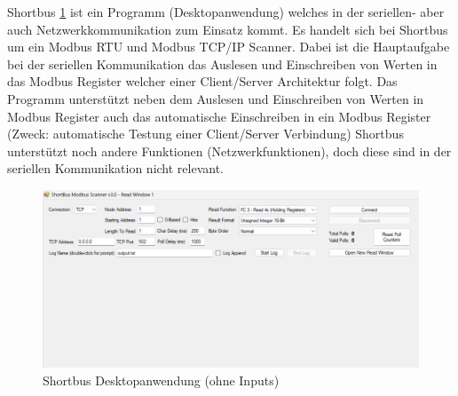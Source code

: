 Shortbus \ref{fig:Shortbusfenster} ist ein Programm (Desktopanwendung) welches in der seriellen- aber auch Netzwerkkommunikation zum Einsatz kommt. 
Es handelt sich bei Shortbus um ein Modbus RTU und Modbus TCP/IP Scanner.
Dabei ist die Hauptaufgabe bei der seriellen Kommunikation das Auslesen und Einschreiben von Werten in das Modbus Register welcher einer Client/Server Architektur folgt.
Das Programm unterstützt neben dem Auslesen und Einschreiben von Werten in Modbus Register auch das  automatische Einschreiben in ein Modbus Register (Zweck: automatische Testung einer Client/Server Verbindung)
Shortbus unterstützt noch andere Funktionen (Netzwerkfunktionen), doch diese sind in der seriellen Kommunikation nicht relevant. 
\cite[vgl.][]{software.informer:2024}

\begin{figure}[H]
	\centering
	\includegraphics[width=1\linewidth]{Bilder/shortbus_fenster}
	\caption{Shortbus Desktopanwendung (ohne Inputs)} 
	\label{fig:Shortbusfenster}
\end{figure}

